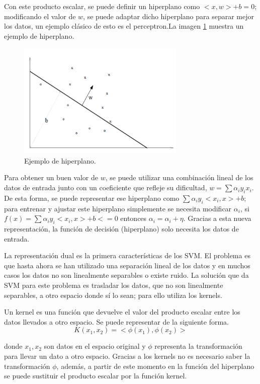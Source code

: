Con este producto escalar, se puede definir un hiperplano como $<x,w> + b = 0$; modificando el valor de $w$, se puede adaptar dicho hiperplano para separar mejor los datos, un ejemplo clásico de esto es el perceptron.La imagen \ref{fig:214} muestra un ejemplo de hiperplano.\newline

\newpage
\begin{figure}[H]
	\centering
	\includegraphics[width=80mm]{imagenes/perceptron_example.png}
	\caption{Ejemplo de hiperplano.}
	\label{fig:214}
\end{figure}

Para obtener un buen valor de $w$, se puede utilizar una combinación lineal de los datos de entrada junto con un coeficiente que refleje su dificultad, $ w = \sum \alpha_i y_i x_i $. De esta forma, se puede representar ese hiperplano como $\sum \alpha_i y_i <x_i,x> + b$; para entrenar y ajustar este hiperplano simplemente se necesita modificar $\alpha_i$, si $f(x) = \sum \alpha_i y_i <x_i,x> + b <= 0$ entonces $\alpha_i = \alpha_i + \eta$. Gracias a esta nueva representación, la función de decisión (hiperplano) solo necesita los datos de entrada.\newline

La representación dual es la primera características de los SVM. El problema es que hasta ahora se han utilizado una separación lineal de los datos y en muchos casos los datos no son linealmente separables o existe ruido. La solución que da SVM para este problema es trasladar los datos, que no son linealmente separables, a otro espacio donde sí lo sean; para ello utiliza los kernels.\newline

Un kernel es una función que devuelve el valor del producto escalar entre los datos llevados a otro espacio. Se puede representar de la siguiente forma.
$$ K(x_1,x_2) = <\phi(x_1), \phi(x_2)> $$

\noindent donde $x_1, x_2$ son datos en el espacio original y $\phi$ representa la transformación para llevar un dato a otro espacio. Gracias a los kernels no es necesario saber la transformación $\phi$, además, a partir de este momento en la función del hiperplano se puede sustituir el producto escalar por la función kernel.\newline

